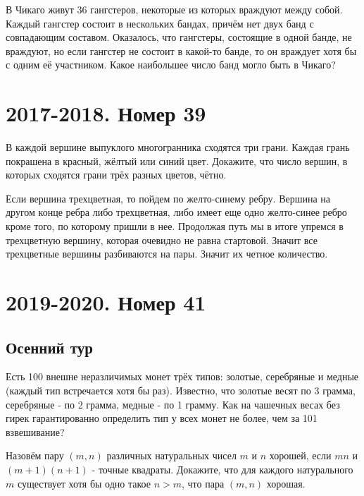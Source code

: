\documentclass[11pt, a4paper]{common/document_template}
\begin{document}
\begin{exercise}
В Чикаго живут 36 гангстеров, некоторые из которых враждуют между собой. Каждый гангстер состоит в нескольких бандах, причём нет двух банд с совпадающим составом. Оказалось, что гангстеры, состоящие в одной банде, не враждуют, но если гангстер не состоит в какой-то банде, то он враждует хотя бы с одним её участником. Какое наибольшее число банд могло быть в Чикаго?
\end{exercise}

\chapter{2017-2018. Номер 39}

\begin{exercise}
В каждой вершине выпуклого многогранника сходятся три грани. Каждая грань покрашена в красный, жёлтый или синий цвет. Докажите, что число вершин, в которых сходятся грани трёх разных цветов, чётно.
\end{exercise}

\begin{Solution}
Если вершина трехцветная, то пойдем по желто-синему ребру. Вершина на другом конце ребра либо трехцветная, либо имеет еще одно желто-синее ребро кроме того, по которому пришли в нее. Продолжая путь мы в итоге упремся в трехцветную вершину, которая очевидно не равна стартовой. Значит все трехцветные вершины разбиваются на пары. Значит их четное количество.
\end{Solution}

\chapter{2019-2020. Номер 41}

\section{Осенний тур}

\begin{exercise}
Есть 100 внешне неразличимых монет трёх типов: золотые, серебряные и медные (каждый тип встречается хотя бы раз). Известно, что золотые весят по 3 грамма, серебряные - по 2 грамма, медные - по 1 грамму. Как на чашечных весах без гирек гарантированно определить тип у всех монет не более, чем за 101 взвешивание?
\end{exercise}

\begin{exercise}
Назовём пару $(m, n)$ различных натуральных чисел $m$ и $n$ хорошей, если $mn$ и $(m+1)(n+1)$ - точные квадраты. Докажите, что для каждого натурального $m$ существует хотя бы одно такое $n > m$, что пара $(m, n)$ хорошая.
\end{exercise}
\end{document}
